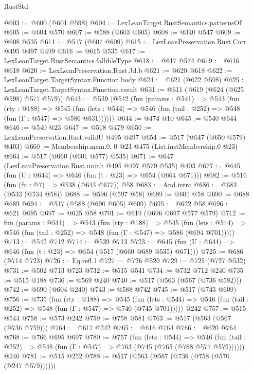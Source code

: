 \begin{lexlean}{RustStd}
\begin{coremodule}
@603 := @600 (@601 @598)
@604 := LexLeanTarget.RustSemantics.patternsOf
@605 := @604 @570
@607 := @588 (@603 @605)
@608 := @340 @547
@609 := @608 @535
@611 := @517 (@607 @609)
@615 := LexLeanPreservation.Rust.Corr @495 @497 @499
@616 := @615 @535
@617 := LexLeanTarget.RustSemantics.fallibleType
@618 := @617 @574
@619 := @616 @618
@620 := LexLeanPreservation.Rust.Jd.b
@621 := @620 @618
@622 := LexLeanTarget.TargetSyntax.Function.body
@624 := @621 (@622 @598)
@625 := LexLeanTarget.TargetSyntax.Function.result
@631 := @611 (@619 (@624 (@625 @598) @577 @579))
@643 := @539
    (@542
      (fun (params : @541) =>
      @543
        (fun (rty : @188) =>
        @545
          (fun (lets : @544) => @546 (fun (tail : @252) => @548 (fun (Γ : @547) => @586 @631))))))
@644 := @474 @10
@645 := @540 @644
@646 := @540 @23
@647 := @518 @479
@650 := LexLeanPreservation.Rust.validU @495 @497
@654 := @517 (@647 (@650 @579) @403)
@660 := Membership.mem.{0, 0} @23 @475 (List.instMembership.{0} @23)
@664 := @517 (@660 (@601 @577) @535)
@671 := @647 (LexLeanPreservation.Rust.uninh @495 @497 @579 @535) @403
@677 := @645 (fun (U : @644) => @646 (fun (t : @23) => @654 (@664 @671)))
@682 := @516 (fun (fn : @7) => @538 (@643 @677)) @58
@683 := And.intro
@686 := @683 (@533 (@534 @58))
@688 := @596 (@597 @58)
@689 := @601 @58
@690 := @688 @689
@694 := @517 (@588 (@690 @605) @609)
@695 := @622 @58
@696 := @621 @695
@697 := @625 @58
@701 := @619 (@696 @697 @577 @579)
@712 := fun (params : @541) =>
  @543
    (fun (rty : @188) =>
    @545
      (fun (lets : @544) => @546 (fun (tail : @252) => @548 (fun (Γ : @547) => @586 (@694 @701)))))
@713 := @542 @712
@714 := @539 @713
@723 := @645 (fun (U : @644) => @646 (fun (t : @23) => @654 (@517 (@660 @689 @535) @671)))
@725 := @686 (@714 @723)
@726 := Eq.refl.{1}
@727 := @726 @520
@729 := @725 (@727 @532)
@731 := @502 @713 @723
@732 := @515 @541
@734 := @732 @712 @240
@735 := @515 @188
@736 := @569 @240
@740 := @517 (@563 (@567 (@736 @582)))
@742 := @690 (@604 @240)
@743 := @588 @742
@745 := @517 (@743 @609)
@756 := @735
    (fun (rty : @188) =>
    @545
      (fun (lets : @544) => @546 (fun (tail : @252) => @548 (fun (Γ : @547) => @740 (@745 @701)))))
    @242
@757 := @515 @544
@758 := @573 @242
@759 := @758 @581
@763 := @517 (@563 (@567 (@736 @759)))
@764 := @617 @242
@765 := @616 @764
@766 := @620 @764
@768 := @766 @695 @697
@780 := @757
    (fun (lets : @544) =>
    @546 (fun (tail : @252) => @548 (fun (Γ : @547) => @763 (@745 (@765 (@768 @577 @579))))))
    @246
@781 := @515 @252
@788 := @517 (@563 (@567 (@736 (@758 (@576 (@247 @579))))))

\end{coremodule}
\end{lexlean}
